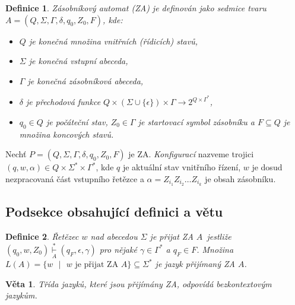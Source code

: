 \documentclass[twocolumn,11pt]{article}
\theoremstyle{plain}
\newtheorem{definition}{Definice}
\theoremstyle{plain}
\newtheorem{theorem}{Věta}
\begin{document}
\begin{definition}
\emph{Zásobníkový automat} (ZA) je definován jako sedmice tvaru
$A = (Q, \Sigma, \Gamma, \delta, q_0, Z_0, F)$, kde:
\begin{itemize}
    \item $Q$ je konečná množina \emph{vnitřních (řídicích) stavů},
    \item $\Sigma$ je konečná \emph{vstupní abeceda},
    \item $\Gamma$ je konečná \emph{zásobníková abeceda},
    \item $\delta$ je \emph{přechodová funkce} $Q \times \left(\Sigma \cup \{\epsilon\}\right) \times \Gamma \rightarrow 2^{Q \times \Gamma^*}$,
    \item $q_0 \in Q$ je \emph{počáteční stav}, $Z_0 \in \Gamma$ je \emph{startovací symbol zásobníku} a $F \subseteq Q$ je množina \emph{koncových stavů}.
\end{itemize}
\end{definition}

Nechť $P = \left(Q, \Sigma, \Gamma, \delta, q_0, Z_0, F\right)$ je ZA. \emph{Konfigurací} nazveme trojici $(q, w, \alpha) \in Q \times \Sigma^* \times \Gamma^*$, kde $q$ je aktuální stav vnitřního
řízení, $w$ je dosud nezpracovaná část vstupního řetězce a $\alpha = Z_{i_1} Z_{i_2} \dots Z_{i_k}$ je obsah zásobníku.

\subsection{Podsekce obsahující definici a větu}
\begin{definition}
\emph{Řetězec $w$ nad abecedou $\Sigma$ je přijat ZA} $A$~jestliže $\left(q_0, w, Z_0\right) \underset{A}{\overset{*}{\vdash}} (q_F, \epsilon, \gamma)$ pro nějaké $\gamma \in \Gamma^*$ a $q_F \in F$.
Množina $L(A) = \{w\textrm{ $|$ }w \textrm{ je přijat ZA } A\} \subseteq \Sigma^*$ je \emph{jazyk přijímaný ZA} $A$.
\end{definition}
\begin{theorem}
Třída jazyků, které jsou přijímány ZA, odpovídá \emph{bezkontextovým jazykům}.
\end{theorem}
\end{document}
